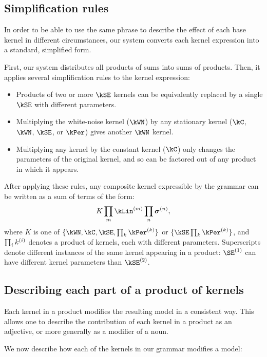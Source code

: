 \subsection{Simplification rules}
\label{sec:desc-simplification}

In order to be able to use the same phrase to describe the effect of each base kernel in different circumstances, our system converts each kernel expression into a standard, simplified form.

First, our system distributes all products of sums into sums of products.
Then, it applies several simplification rules to the kernel expression:

\begin{itemize}
\item Products of two or more $\kSE$ kernels can be equivalently replaced by a single $\kSE$ with different parameters.
\item Multiplying the white-noise kernel ($\kWN$) by any stationary kernel ($\kC$, $\kWN$, $\kSE$, or $\kPer$) gives another $\kWN$ kernel.
\item Multiplying any kernel by the constant kernel ($\kC$) only changes the parameters of the original kernel, and so can be factored out of any product in which it appears.
\end{itemize}

After applying these rules, any composite kernel expressible by the grammar can be written as a sum of terms of the form:
\begin{align}
K \prod_m \kLin^{(m)} \prod_n \boldsymbol\sigma^{(n)},
\label{eq:sop}
\end{align}
where $K$ is one of $\{\kWN, \kC, \kSE, \prod_k \kPer^{(k)}\}$ or $\{\kSE \prod_k \kPer^{(k)}\}$, 
and $\prod_ik^{(i)}$ denotes a product of kernels, each with different parameters.
Superscripts denote different instances of the same kernel appearing in a product: $\SE^{(1)}$ can have different kernel parameters than $\kSE^{(2)}$.


\subsection{Describing each part of a product of kernels}

Each kernel in a product modifies the resulting \gp{} model in a consistent way.
This allows one to describe the contribution of each kernel in a product as an adjective, or more generally as a modifier of a noun.

We now describe how each of the kernels in our grammar modifies a \gp{} model:


